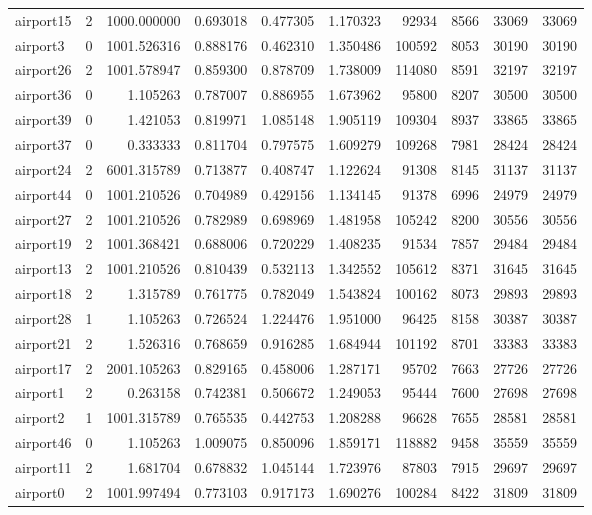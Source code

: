 \begin{longtable}{|l|r|r|r|r|r|r|r|r|r|}
airport15 & 2 & 1000.000000 & 0.693018 & 0.477305 & 1.170323 & 92934 & 8566 & 33069 & 33069 \\
airport3 & 0 & 1001.526316 & 0.888176 & 0.462310 & 1.350486 & 100592 & 8053 & 30190 & 30190 \\
airport26 & 2 & 1001.578947 & 0.859300 & 0.878709 & 1.738009 & 114080 & 8591 & 32197 & 32197 \\
airport36 & 0 & 1.105263 & 0.787007 & 0.886955 & 1.673962 & 95800 & 8207 & 30500 & 30500 \\
airport39 & 0 & 1.421053 & 0.819971 & 1.085148 & 1.905119 & 109304 & 8937 & 33865 & 33865 \\
airport37 & 0 & 0.333333 & 0.811704 & 0.797575 & 1.609279 & 109268 & 7981 & 28424 & 28424 \\
airport24 & 2 & 6001.315789 & 0.713877 & 0.408747 & 1.122624 & 91308 & 8145 & 31137 & 31137 \\
airport44 & 0 & 1001.210526 & 0.704989 & 0.429156 & 1.134145 & 91378 & 6996 & 24979 & 24979 \\
airport27 & 2 & 1001.210526 & 0.782989 & 0.698969 & 1.481958 & 105242 & 8200 & 30556 & 30556 \\
airport19 & 2 & 1001.368421 & 0.688006 & 0.720229 & 1.408235 & 91534 & 7857 & 29484 & 29484 \\
airport13 & 2 & 1001.210526 & 0.810439 & 0.532113 & 1.342552 & 105612 & 8371 & 31645 & 31645 \\
airport18 & 2 & 1.315789 & 0.761775 & 0.782049 & 1.543824 & 100162 & 8073 & 29893 & 29893 \\
airport28 & 1 & 1.105263 & 0.726524 & 1.224476 & 1.951000 & 96425 & 8158 & 30387 & 30387 \\
airport21 & 2 & 1.526316 & 0.768659 & 0.916285 & 1.684944 & 101192 & 8701 & 33383 & 33383 \\
airport17 & 2 & 2001.105263 & 0.829165 & 0.458006 & 1.287171 & 95702 & 7663 & 27726 & 27726 \\
airport1 & 2 & 0.263158 & 0.742381 & 0.506672 & 1.249053 & 95444 & 7600 & 27698 & 27698 \\
airport2 & 1 & 1001.315789 & 0.765535 & 0.442753 & 1.208288 & 96628 & 7655 & 28581 & 28581 \\
airport46 & 0 & 1.105263 & 1.009075 & 0.850096 & 1.859171 & 118882 & 9458 & 35559 & 35559 \\
airport11 & 2 & 1.681704 & 0.678832 & 1.045144 & 1.723976 & 87803 & 7915 & 29697 & 29697 \\
airport0 & 2 & 1001.997494 & 0.773103 & 0.917173 & 1.690276 & 100284 & 8422 & 31809 & 31809 \\

\end{longtable}

